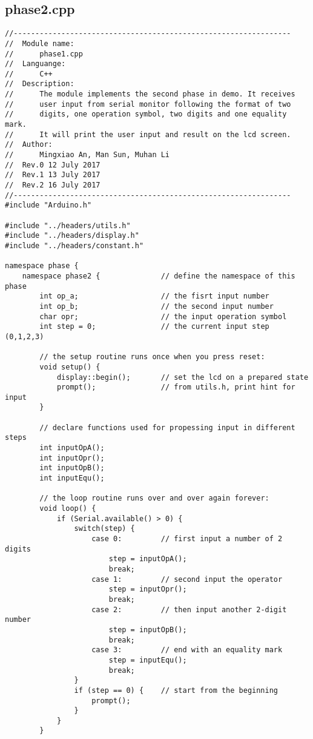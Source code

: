 \subsection{phase2.cpp}
\begin{verbatim}
//----------------------------------------------------------------
//  Module name:
//      phase1.cpp
//  Languange:
//      C++
//  Description:
//      The module implements the second phase in demo. It receives 
//      user input from serial monitor following the format of two 
//      digits, one operation symbol, two digits and one equality mark.
//      It will print the user input and result on the lcd screen.
//  Author:
//      Mingxiao An, Man Sun, Muhan Li
//  Rev.0 12 July 2017
//  Rev.1 13 July 2017
//  Rev.2 16 July 2017
//----------------------------------------------------------------
#include "Arduino.h"

#include "../headers/utils.h"
#include "../headers/display.h"
#include "../headers/constant.h"

namespace phase {
    namespace phase2 {              // define the namespace of this phase
        int op_a;                   // the fisrt input number
        int op_b;                   // the second input number
        char opr;                   // the input operation symbol
        int step = 0;               // the current input step (0,1,2,3)

        // the setup routine runs once when you press reset:
        void setup() {
            display::begin();       // set the lcd on a prepared state
            prompt();               // from utils.h, print hint for input
        }

        // declare functions used for propessing input in different steps
        int inputOpA();
        int inputOpr();
        int inputOpB();
        int inputEqu();

        // the loop routine runs over and over again forever:
        void loop() {
            if (Serial.available() > 0) {
                switch(step) {
                    case 0:         // first input a number of 2 digits
                        step = inputOpA(); 
                        break;  
                    case 1:         // second input the operator
                        step = inputOpr(); 
                        break;  
                    case 2:         // then input another 2-digit number
                        step = inputOpB(); 
                        break;  
                    case 3:         // end with an equality mark
                        step = inputEqu(); 
                        break;  
                }
                if (step == 0) {    // start from the beginning
                    prompt();       
                }
            }
        }


\end{verbatim}
